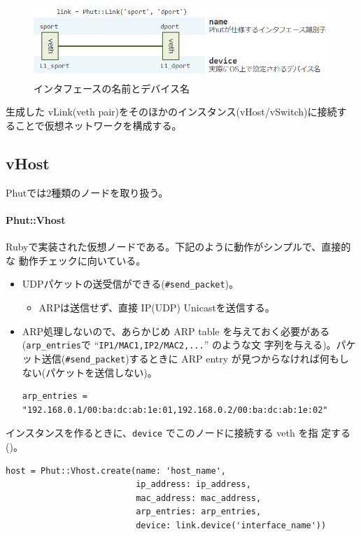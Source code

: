 \begin{figure}[h]
 \centering
 \includegraphics[scale=0.6]{img/phut-vlink-model2.png}
 \caption{インタフェースの名前とデバイス名}
 \label{fig:vlink-model2}
\end{figure}

生成した vLink(veth pair)をそのほかのインスタンス(vHost/vSwitch)に接続す
ることで仮想ネットワークを構成する。

\subsection{vHost}
Phutでは2種類のノードを取り扱う。

\paragraph{Phut::Vhost}

Rubyで実装された仮想ノードである。下記のように動作がシンプルで、直接的な
動作チェックに向いている。
\begin{itemize}
 \item UDPパケットの送受信ができる(\verb|#send_packet|)。
       \begin{itemize}
        \item ARPは送信せず、直接 IP(UDP) Unicastを送信する。
       \end{itemize}
 \item ARP処理しないので、あらかじめ ARP table を与えておく必要がある
       (\verb|arp_entries|で ``\verb|IP1/MAC1,IP2/MAC2,...|'' のような文
       字列を与える)。パケット送信(\verb|#send_packet|)するときに ARP
       entry が見つからなければ何もしない(パケットを送信しない)。
\begin{lstlisting}
arp_entries = "192.168.0.1/00:ba:dc:ab:1e:01,192.168.0.2/00:ba:dc:ab:1e:02"
\end{lstlisting}
\end{itemize}


インスタンスを作るときに、\verb|device| でこのノードに接続する veth を指
定する()。
\begin{lstlisting}[caption=Phut::Vhostインスタンスの作成,label=lst:create-vhost-instance]
host = Phut::Vhost.create(name: 'host_name',
                          ip_address: ip_address,
                          mac_address: mac_address,
                          arp_entries: arp_entries,
                          device: link.device('interface_name'))
\end{lstlisting}

